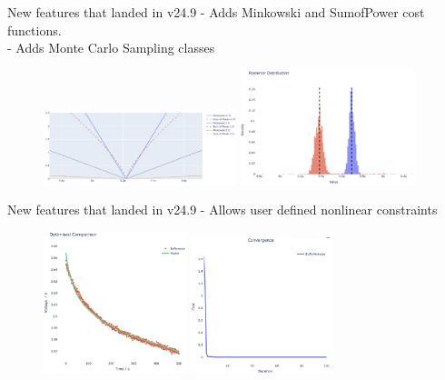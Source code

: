 \documentclass[aspectratio=169]{beamer}
\begin{document}
\begin{frame}[fragile,t]{New features that landed in v24.9}
    \vspace{-6mm}
     - Adds Minkowski and SumofPower cost functions. \\
     - Adds Monte Carlo Sampling classes

    \begin{figure}
        \centering
        \includegraphics[width=0.5\textwidth]{Images/Highlights/minkowski-sum-of-power.png}
        \hspace{1em}
        \includegraphics[width=0.455\textwidth]{Images/Highlights/SPMe posterior.png}
        \label{fig:optimisersNew}
    \end{figure}
\end{frame}

\begin{frame}[fragile,t]{New features that landed in v24.9}
    \vspace{-6mm}
     - Allows user defined nonlinear constraints

    \begin{figure}
        \centering
        \includegraphics[width=0.37\textwidth]{Images/Highlights/trust-const-identification.png}
        \hspace{3em}
        \includegraphics[width=0.37\textwidth]{Images/Highlights/trust-const-convergence.png}
        \label{fig:WeppnerHuggins}
    \end{figure}
\end{frame}
\end{document}
